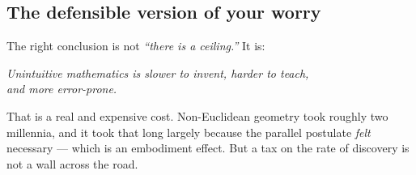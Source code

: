 \subsection{The defensible version of your worry}

\begin{critbox}[title={What survives the correction --- and it is not nothing}]
The right conclusion is not \emph{``there is a ceiling.''} It is:
\begin{center}\itshape\large
Unintuitive mathematics is slower to invent, harder to teach,\\and more error-prone.
\end{center}
That is a real and expensive cost. Non-Euclidean geometry took roughly two millennia, and it took
that long largely because the parallel postulate \emph{felt} necessary --- which is an embodiment
effect. But a tax on the rate of discovery is not a wall across the road.
\end{critbox}
